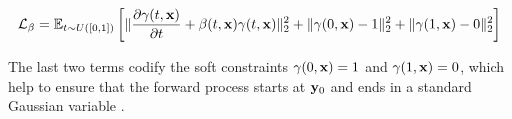 \begin{equation*}
\mathcal{L}_\beta = \mathbb{E}_{t \sim U([0,1])} \left[
\lVert \frac{\partial \gamma(t,\bold{x})}{\partial t} + \beta(t,\bold{x})\gamma(t,\bold{x}) \rVert_2^2
+ \lVert \gamma(0,\bold{x}) - 1 \rVert_2^2 
+ \lVert \gamma(1,\bold{x}) - 0 \rVert_2^2
\right]
\end{equation*}

The last two terms codify the soft constraints $\gamma(0,\bold{x})= 1$ and $\gamma(1,\bold{x}) = 0$, which help to ensure that the forward process starts at $\bold{y}_{0}$ and ends in a standard Gaussian variable \parencite{Maggiora2023}. 












